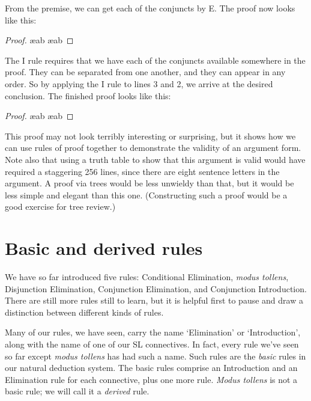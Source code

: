 From the premise, we can get each of the conjuncts by {\eand}E. The proof now looks like this:

\begin{proof}
	 \ae{ab}
	 \ae{ab}
\end{proof}

The {\eand}I rule requires that we have each of the conjuncts available somewhere in the proof. They can be separated from one another, and they can appear in any order. So by applying the {\eand}I rule to lines 3 and 2, we arrive at the desired conclusion. The finished proof looks like this:

\begin{proof}

	 \ae{ab}
	 \ae{ab}
	 
\end{proof}

This proof may not look terribly interesting or surprising, but it shows how we can use rules of proof together to demonstrate the validity of an argument form. Note also that using a truth table to show that this argument is valid would have required a staggering 256 lines, since there are eight sentence letters in the argument. A proof via trees would be less unwieldy than that, but it would be less simple and elegant than this one. (Constructing such a proof would be a good exercise for tree review.)


\section{Basic and derived rules}
\label{sec:basic}

We have so far introduced five rules: Conditional Elimination, \emph{modus tollens}, Disjunction Elimination, Conjunction Elimination, and Conjunction Introduction. There are still more rules still to learn, but it is helpful first to pause and draw a distinction between different kinds of rules.

Many of our rules, we have seen, carry the name `Elimination' or `Introduction', along with the name of one of our SL connectives. In fact, every rule we've seen so far except \emph{modus tollens} has had such a name. Such rules are the \emph{basic} rules in our natural deduction system. The basic rules comprise an Introduction and an Elimination rule for each connective, plus one more rule. \emph{Modus tollens} is not a basic rule; we will call it a \emph{derived} rule.

